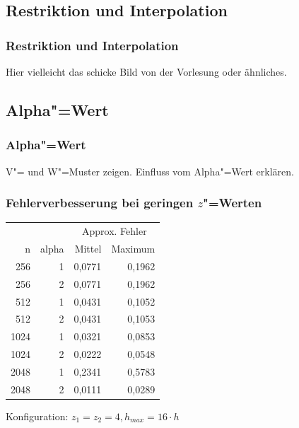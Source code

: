 \documentclass{beamer}
\begin{document}
\subsection{Restriktion und Interpolation}
\begin{frame}
    \frametitle{Restriktion und Interpolation}
    Hier vielleicht das schicke Bild von der Vorlesung oder ähnliches.
\end{frame}

\subsection{Alpha"=Wert} %
\begin{frame}
    \frametitle{Alpha"=Wert}
    V"= und W"=Muster zeigen. Einfluss vom Alpha"=Wert erklären.
\end{frame}

\begin{frame}
    \frametitle{Fehlerverbesserung bei geringen \(z\)"=Werten}
    \begin{center}
    \begin{tabular}{|r|r|r|r|} \hline
    & & \multicolumn{2}{c|}{Approx. Fehler} \\
    n    & alpha & Mittel & Maximum \\ \hline \hline
    256  & 1     & 0,0771 & 0,1962  \\
    256  & 2     & 0,0771 & 0,1962  \\
    512  & 1     & 0,0431 & 0,1052  \\
    512  & 2     & 0,0431 & 0,1053  \\
    1024 & 1     & 0,0321 & 0,0853  \\
    1024 & 2     & 0,0222 & 0,0548  \\
    2048 & 1     & 0,2341 & 0,5783  \\
    2048 & 2     & 0,0111 & 0,0289  \\ \hline
    \end{tabular}
    \end{center}
    Konfiguration: \(z_1 = z_2 = 4, h_{max} = 16 \cdot h\)
\end{frame}
\end{document}
